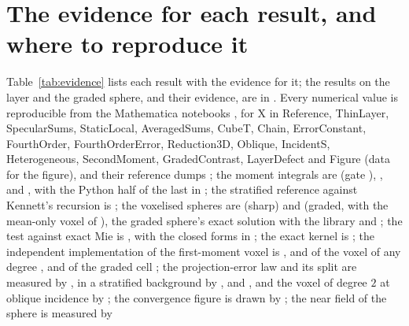 \documentclass[11pt,a4paper]{article}
\begin{document}
\FloatBarrier

\section{The evidence for each result, and where to reproduce it}\label{app:evidence}

Table~\ref{tab:evidence} lists each result with the evidence for it; the results on the layer and the
graded sphere, and their evidence, are in \citet{NestorError2026}. Every numerical value is reproducible from the Mathematica notebooks
, for X in Reference, ThinLayer, SpecularSums,
StaticLocal, AveragedSums, CubeT, Chain, ErrorConstant, FourthOrder, FourthOrderError, Reduction3D,
Oblique, IncidentS, Heterogeneous, SecondMoment, GradedContrast, LayerDefect and Figure (data for the figure), and their reference dumps
; the moment integrals are
 (gate ), ,
 and , with the Python half of the last in
; the stratified reference against Kennett's recursion is
; the voxelised spheres are
 (sharp) and  (graded, with the mean-only voxel of ), the graded sphere's exact solution
 with the library 
and ;
the test against exact Mie is
, with the closed forms in ; the exact kernel is
; the independent implementation of the
first-moment voxel is , and of the voxel of any
degree , and of the graded cell
; the projection-error law and its split are measured by
, in a stratified background by
,
 and , and the voxel of degree $2$ at oblique incidence by
; the convergence figure is drawn by
; the near field of the sphere is measured by
\end{document}

